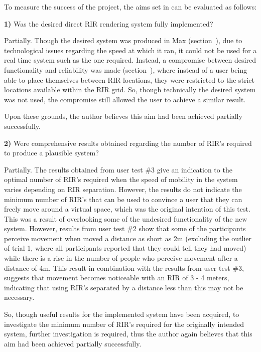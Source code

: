 \documentclass[../../main.tex]{subfiles}
\begin{document}
			To measure the success of the project, the aims set in  can be evaluated as follows:

			\textbf{1)} Was the desired direct \ac{RIR} rendering system fully implemented?

				Partially. Though the desired system was produced in Max (section~), due to technological issues regarding the speed at which it ran, it could not be used for a real time system such as the one required. Instead, a compromise between desired functionality and reliability was made (section~), where instead of a user being able to place themselves between \ac{RIR} locations, they were restricted to the strict locations available within the \ac{RIR} grid. So, though technically the desired system was not used, the compromise still allowed the user to achieve a similar result.

				Upon these grounds, the author believes this aim had been achieved partially successfully.


			\textbf{2)} Were comprehensive results obtained regarding the number of \ac{RIR}'s required to produce a plausible system?


				Partially. The results obtained from user test \#3 give an indication to the optimal number of \ac{RIR}'s required when the speed of mobility in the system varies depending on \ac{RIR} separation. However, the results do not indicate the minimum number of \ac{RIR}'s that can be used to convince a user that they can freely move around a virtual space, which was the original intention of this test. This was a result of overlooking some of the undesired functionality of the new system. However, results from user test \#2 show that some of the participants perceive movement when moved a distance as short as 2m (excluding the outlier of trial 1, where all participants reported that they could tell they had moved) while there is a rise in the number of people who perceive movement after a distance of 4m. This result in combination with the results from user test \#3, suggests that movement becomes noticeable with an \ac{RIR} of 3 - 4 meters, indicating that using \ac{RIR}'s separated by a distance less than this may not be necessary.

				So, though useful results for the implemented system have been acquired, to investigate the minimum number of \ac{RIR}'s required for the originally intended system, further investigation is required, thus the author again believes that this aim had been achieved partially successfully.
\end{document}
